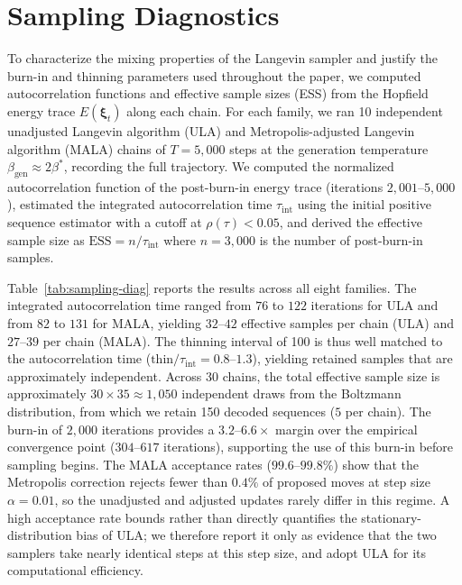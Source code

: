 \section{Sampling Diagnostics}\label{si:sampling-diagnostics}

To characterize the mixing properties of the Langevin sampler and justify the burn-in and thinning parameters used throughout the paper, we computed autocorrelation functions and effective sample sizes (ESS) from the Hopfield energy trace $E(\boldsymbol{\xi}_t)$ along each chain. For each family, we ran 10 independent unadjusted Langevin algorithm (ULA) and Metropolis-adjusted Langevin algorithm (MALA) chains of $T{=}5{,}000$ steps at the generation temperature $\beta_{\mathrm{gen}} \approx 2\beta^*$, recording the full trajectory. We computed the normalized autocorrelation function of the post-burn-in energy trace (iterations $2{,}001$--$5{,}000$), estimated the integrated autocorrelation time $\tau_{\mathrm{int}}$ using the initial positive sequence estimator with a cutoff at $\rho(\tau) < 0.05$, and derived the effective sample size as $\mathrm{ESS} = n/\tau_{\mathrm{int}}$ where $n{=}3{,}000$ is the number of post-burn-in samples.

Table~\ref{tab:sampling-diag} reports the results across all eight families. The integrated autocorrelation time ranged from $76$ to $122$ iterations for ULA and from $82$ to $131$ for MALA, yielding $32$--$42$ effective samples per chain (ULA) and $27$--$39$ per chain (MALA). The thinning interval of 100 is thus well matched to the autocorrelation time ($\mathrm{thin}/\tau_{\mathrm{int}} = 0.8$--$1.3$), yielding retained samples that are approximately independent. Across 30 chains, the total effective sample size is approximately $30 \times 35 \approx 1{,}050$ independent draws from the Boltzmann distribution, from which we retain 150 decoded sequences ($5$ per chain). The burn-in of $2{,}000$ iterations provides a $3.2$--$6.6\times$ margin over the empirical convergence point ($304$--$617$ iterations), supporting the use of this burn-in before sampling begins. The MALA acceptance rates ($99.6$--$99.8\%$) show that the Metropolis correction rejects fewer than $0.4\%$ of proposed moves at step size $\alpha{=}0.01$, so the unadjusted and adjusted updates rarely differ in this regime. A high acceptance rate bounds rather than directly quantifies the stationary-distribution bias of ULA; we therefore report it only as evidence that the two samplers take nearly identical steps at this step size, and adopt ULA for its computational efficiency.

